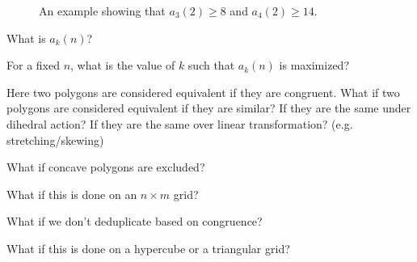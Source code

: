 \documentclass{article}
\begin{document}
\begin{figure}[!h]
  \caption{
    An example showing that $a_3(2) \geq 8$ and $a_4(2) \geq 14$.
  }
\end{figure}
\begin{question}
  What is $a_k(n)$?
\end{question}
\begin{related}
  \item For a fixed $n$, what is the value of $k$ such that $a_k(n)$ is
    maximized?
  \item Here two polygons are considered equivalent if they are congruent. What
  if two polygons are considered equivalent if they are similar?
  If they are the same under dihedral action?
  If they are the same over linear transformation? (e.g. stretching/skewing)
  \item What if concave polygons are excluded?
  \item What if this is done on an $n \times m$ grid?
  \item What if we don't deduplicate based on congruence?
  \item What if this is done on a hypercube or a triangular grid?
\end{related}
\end{document}
